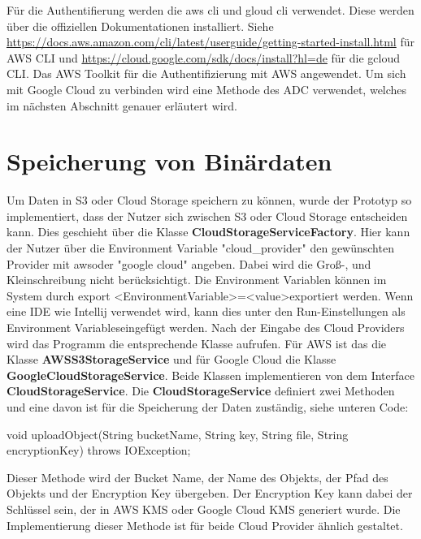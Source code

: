 Für die Authentifierung werden die aws cli und gloud cli verwendet. Diese werden über die offiziellen Dokumentationen installiert. Siehe \url{https://docs.aws.amazon.com/cli/latest/userguide/getting-started-install.html} für AWS CLI und  \url{https://cloud.google.com/sdk/docs/install?hl=de} für die gcloud CLI.  Das AWS Toolkit für die Authentifizierung mit AWS angewendet. Um sich mit Google Cloud zu verbinden wird eine Methode des ADC verwendet, welches im nächsten Abschnitt genauer erläutert wird.

\newpage

\section{Speicherung von Binärdaten}

Um Daten in S3 oder Cloud Storage speichern zu können, wurde der Prototyp so implementiert, dass der Nutzer sich zwischen S3 oder Cloud Storage entscheiden kann. Dies geschieht über die Klasse \textbf{CloudStorageServiceFactory}. Hier kann der Nutzer über die Environment Variable "cloud\_provider" den gewünschten Provider mit \glqq aws\grqq oder "google cloud" angeben. Dabei wird die Groß-, und Kleinschreibung nicht berücksichtigt. Die Environment Variablen können im System durch \glqq export <EnvironmentVariable>=<value>\grqq exportiert werden. Wenn eine IDE wie Intellij verwendet wird, kann dies unter den Run-Einstellungen als \glqq Environment Variables\grqq eingefügt werden. Nach der Eingabe des Cloud Providers wird das Programm die entsprechende Klasse aufrufen. Für AWS ist das die Klasse \textbf{AWSS3StorageService} und für Google Cloud die Klasse \textbf{GoogleCloudStorageService}. Beide Klassen implementieren von dem Interface \textbf{CloudStorageService}. Die \textbf{CloudStorageService} definiert zwei Methoden und eine davon ist für die Speicherung der Daten zuständig, siehe unteren Code:

\begin{code}
	void uploadObject(String bucketName, String key, String file, String encryptionKey) 
	throws IOException;
\end{code}

Dieser Methode wird der Bucket Name, der Name des Objekts, der Pfad des Objekts und der Encryption Key übergeben. Der Encryption Key kann dabei der Schlüssel sein, der in AWS KMS oder Google Cloud KMS generiert wurde. Die Implementierung dieser Methode ist für beide Cloud Provider ähnlich gestaltet.

